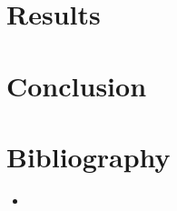 \documentclass[a4paper, twoside, 11pt]{report}
\theoremstyle{theorem}
\theoremstyle{remark}
\theoremstyle{exemple}
\begin{document}
\chapter{Results}


\chapter*{Conclusion}

    \paragraph{}
    

\chapter*{Bibliography}
    
    \begin{itemize}
        \item
    \end{itemize}
    
\end{document}

